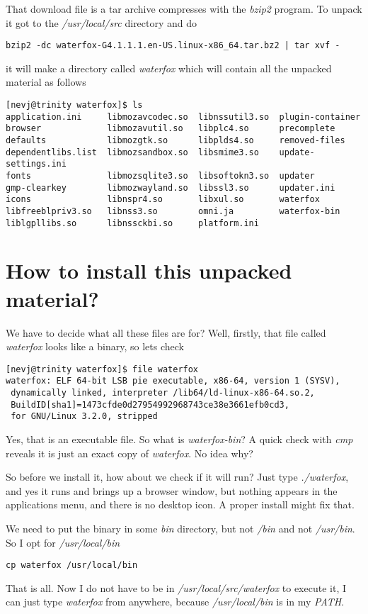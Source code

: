 \documentclass{article}  %
\begin{document}
That download file is a tar archive compresses with the {\em bzip2} program. To unpack it  got to the {\em /usr/local/src} directory and do 
\begin{verbatim}
bzip2 -dc waterfox-G4.1.1.1.en-US.linux-x86_64.tar.bz2 | tar xvf -
\end{verbatim}
it will make a directory called {\em waterfox} which will contain all the unpacked material as follows
\begin{verbatim}
[nevj@trinity waterfox]$ ls
application.ini     libmozavcodec.so  libnssutil3.so  plugin-container
browser             libmozavutil.so   libplc4.so      precomplete
defaults            libmozgtk.so      libplds4.so     removed-files
dependentlibs.list  libmozsandbox.so  libsmime3.so    update-settings.ini
fonts               libmozsqlite3.so  libsoftokn3.so  updater
gmp-clearkey        libmozwayland.so  libssl3.so      updater.ini
icons               libnspr4.so       libxul.so       waterfox
libfreeblpriv3.so   libnss3.so        omni.ja         waterfox-bin
liblgpllibs.so      libnssckbi.so     platform.ini
\end{verbatim}

\section{How to install this unpacked material?}
We have to decide what all these files are for? Well, firstly, that file called {\em waterfox} looks like a binary, so lets check
\begin{verbatim}
[nevj@trinity waterfox]$ file waterfox
waterfox: ELF 64-bit LSB pie executable, x86-64, version 1 (SYSV),
 dynamically linked, interpreter /lib64/ld-linux-x86-64.so.2,
 BuildID[sha1]=1473cfde0d27954992968743ce38e3661efb0cd3,
 for GNU/Linux 3.2.0, stripped
\end{verbatim}
Yes, that is an executable file. So what is {\em  waterfox-bin}?  A quick check with {\em cmp} reveals it is just an exact copy of {\em waterfox}.  No idea why?

So before we install it, how about we check if it will run? Just type {\em ./waterfox}, and yes it runs and brings up a browser window, but nothing appears in the applications menu, and there is no desktop icon.  A proper install might fix that. 

We need to put the binary in some {\em bin} directory, but not {\em /bin} and not {\em /usr/bin}. So I opt for {\em /usr/local/bin}
\begin{verbatim}
cp waterfox /usr/local/bin
\end{verbatim}
That is all.  Now I do not have to be in {\em /usr/local/src/waterfox} to execute it, I can just type {\em waterfox} from anywhere, because {\em /usr/local/bin} is in my {\em PATH}. 
\end{document}
